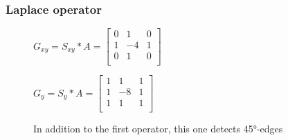 \subsubsection{Laplace operator}

\begin{figure}[!htb]
    \centering
    \begin{minipage}{.5\textwidth}
        \centering
        $G_{xy} = S_{xy} * A =
        \left[ \begin{array}{rrr}
        0 & 1 & 0 \\
        1 & -4 & 1 \\
        0 & 1 & 0 \\
        \end{array}\right] $
    \end{minipage}%
    \begin{minipage}{.5\textwidth}
        \centering
        $G_{y} = S_{y} * A =
        \left[ \begin{array}{rrr}
        1 & 1 & 1 \\
        1 & -8 & 1 \\
        1 & 1 & 1 \\
        \end{array}\right] $
    \end{minipage}
    \caption{In addition to the first operator, this one detects 45°-edges}
\end{figure}




%

